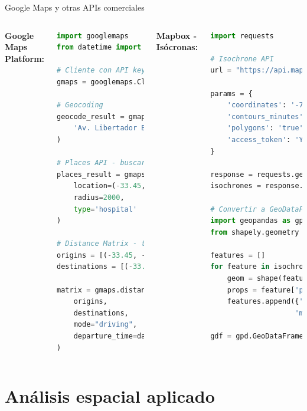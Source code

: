 \documentclass[10pt,aspectratio=169]{beamer}
\begin{document}
\begin{frame}[fragile]{Google Maps y otras APIs comerciales}
    \begin{columns}[T]
        \textbf{Google Maps Platform:}
        \begin{lstlisting}[language=Python]
import googlemaps
from datetime import datetime

# Cliente con API key
gmaps = googlemaps.Client(key='YOUR_API_KEY')

# Geocoding
geocode_result = gmaps.geocode(
    'Av. Libertador Bernardo O\'Higgins 3363, Santiago'
)

# Places API - buscar hospitales cercanos
places_result = gmaps.places_nearby(
    location=(-33.45, -70.65),
    radius=2000,
    type='hospital'
)

# Distance Matrix - tiempos de viaje
origins = [(-33.45, -70.65), (-33.44, -70.64)]
destinations = [(-33.46, -70.66)]

matrix = gmaps.distance_matrix(
    origins, 
    destinations,
    mode="driving",
    departure_time=datetime.now()
)
        \end{lstlisting}
        
        \textbf{Mapbox - Isócronas:}
        \begin{lstlisting}[language=Python]
import requests

# Isochrone API
url = "https://api.mapbox.com/isochrone/v1/mapbox/driving"

params = {
    'coordinates': '-70.65,-33.45',
    'contours_minutes': '5,10,15',
    'polygons': 'true',
    'access_token': 'YOUR_TOKEN'
}

response = requests.get(url, params=params)
isochrones = response.json()

# Convertir a GeoDataFrame
import geopandas as gpd
from shapely.geometry import shape

features = []
for feature in isochrones['features']:
    geom = shape(feature['geometry'])
    props = feature['properties']
    features.append({'geometry': geom, 
                    'minutes': props['contour']})

gdf = gpd.GeoDataFrame(features)
        \end{lstlisting}
    \end{columns}
\end{frame}

\section{Análisis espacial aplicado}
\end{document}
